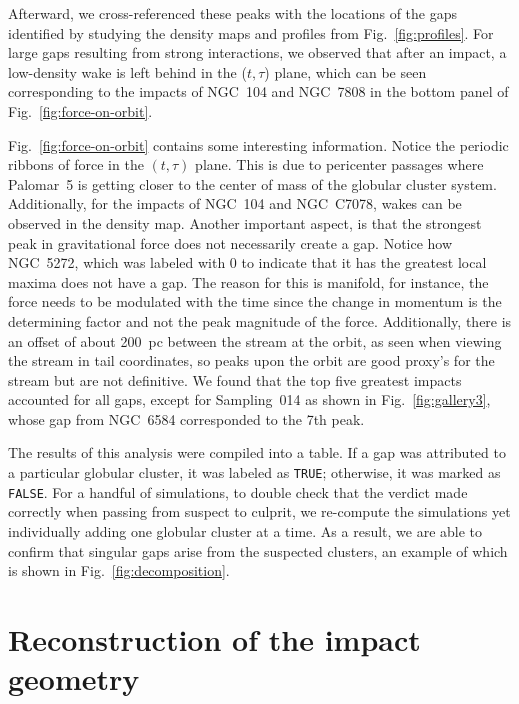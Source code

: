 \documentclass{aa}
\begin{document}
\begin{appendix}
    Afterward, we cross-referenced these peaks with the locations of the gaps identified by studying the density maps and profiles from Fig.~\ref{fig:profiles}. For large gaps resulting from strong interactions, we observed that after an impact, a low-density wake is left behind in the ($t,\tau$) plane, which can be seen corresponding to the impacts of NGC~104 and NGC~7808 in the bottom panel of Fig.~\ref{fig:force-on-orbit}.



    Fig.~\ref{fig:force-on-orbit} contains some interesting information. Notice the periodic ribbons of force in the $(t,\tau)$ plane. This is due to pericenter passages where Palomar~5 is getting closer to the center of mass of the globular cluster system. Additionally, for the impacts of NGC~104 and NGC~C7078, wakes can be observed in the density map. Another important aspect, is that the strongest peak in gravitational force does not necessarily create a gap. Notice how NGC~5272, which was labeled with 0 to indicate that it has the greatest local maxima does not have a gap. The reason for this is manifold, for instance, the force needs to be modulated with the time since the change in momentum is the determining factor and not the peak magnitude of the force.  Additionally, there is an offset of about 200~pc between the stream at the orbit, as seen when viewing the stream in tail coordinates, so peaks upon the orbit are good proxy's for the stream but are not definitive. We found that the top five greatest impacts accounted for all gaps, except for Sampling~014 as shown in Fig.~\ref{fig:gallery3}, whose gap from NGC~6584 corresponded to the 7th peak. 

    The results of this analysis were compiled into a table. If a gap was attributed to a particular globular cluster, it was labeled as \texttt{TRUE}; otherwise, it was marked as \texttt{FALSE}. For a handful of simulations, to double check that the verdict made correctly when passing from suspect to culprit, we re-compute the simulations yet individually adding one globular cluster at a time. As a result, we are able to confirm that singular gaps arise from the suspected clusters, an example of which is shown in Fig.~\ref{fig:decomposition}. 



    \section{Reconstruction of the impact geometry} \label{sec:reconstruction}


\end{appendix}
\end{document}
